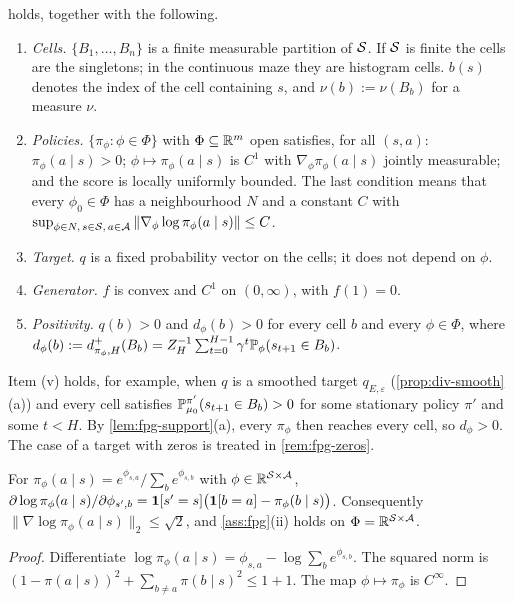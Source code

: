 \begin{assumption}[A-FPG]\label{ass:fpg}
 holds, together with the following.
\begin{enumerate}[nosep,label=(\roman*)]
\item \emph{Cells.} $\{B_1,\dots,B_n\}$ is a finite measurable partition of $\mathcal{S}$.
  If $\mathcal{S}$ is finite the cells are the singletons; in the continuous maze they are histogram cells.
  $b(s)$ denotes the index of the cell containing $s$, and $\nu(b):=\nu(B_b)$ for a measure $\nu$.
\item \emph{Policies.} $\{\pi_\phi:\phi\in\Phi\}$ with $\Phi\subseteq\mathbb{R}^m$ open satisfies, for all $(s,a)$:
  $\pi_\phi(a\mid s)>0$; $\phi\mapsto\pi_\phi(a\mid s)$ is $C^1$ with $\nabla_\phi\pi_\phi(a\mid s)$ jointly measurable;
  and the score is locally uniformly bounded.
  The last condition means that every $\phi_0\in\Phi$ has a neighbourhood $N$ and a constant $C$ with
  $\sup_{\phi\in N,\,s\in\mathcal{S},\,a\in\mathcal{A}}\|\nabla_\phi\log\pi_\phi(a\mid s)\|\le C$.
\item \emph{Target.} $q$ is a fixed probability vector on the cells; it does not depend on $\phi$.
\item \emph{Generator.} $f$ is convex and $C^1$ on $(0,\infty)$, with $f(1)=0$.
\item \emph{Positivity.} $q(b)>0$ and $d_\phi(b)>0$ for every cell $b$ and every $\phi\in\Phi$, where
  $d_\phi(b):=d^+_{\pi_\phi,H}(B_b)=Z_H^{-1}\sum_{t=0}^{H-1}\gamma^t\mathbb{P}_\phi(s_{t+1}\in B_b)$.
\end{enumerate}
\end{assumption}

Item (v) holds, for example, when $q$ is a smoothed target $q_{E,\varepsilon}$ (\cref{prop:div-smooth}(a)) and every cell satisfies $\mathbb{P}^{\pi'}_{\mu_0}(s_{t+1}\in B_b)>0$ for some stationary policy $\pi'$ and some $t<H$.
By \cref{lem:fpg-support}(a), every $\pi_\phi$ then reaches every cell, so $d_\phi>0$.
The case of a target with zeros is treated in \cref{rem:fpg-zeros}.

\begin{lemma}\label{lem:fpg-softmax}
For $\pi_\phi(a\mid s)=e^{\phi_{s,a}}/\sum_be^{\phi_{s,b}}$ with $\phi\in\mathbb{R}^{\mathcal{S}\times\mathcal{A}}$,
$\partial\log\pi_\phi(a\mid s)/\partial\phi_{s',b}=\mathbf{1}[s'=s]\big(\mathbf{1}[b=a]-\pi_\phi(b\mid s)\big)$.
Consequently $\|\nabla\log\pi_\phi(a\mid s)\|_2\le\sqrt2$, and \cref{ass:fpg}(ii) holds on $\Phi=\mathbb{R}^{\mathcal{S}\times\mathcal{A}}$.
\end{lemma}
\begin{proof}
Differentiate $\log\pi_\phi(a\mid s)=\phi_{s,a}-\log\sum_be^{\phi_{s,b}}$.
The squared norm is $(1-\pi(a\mid s))^2+\sum_{b\ne a}\pi(b\mid s)^2\le1+1$.
The map $\phi\mapsto\pi_\phi$ is $C^\infty$.
\end{proof}

